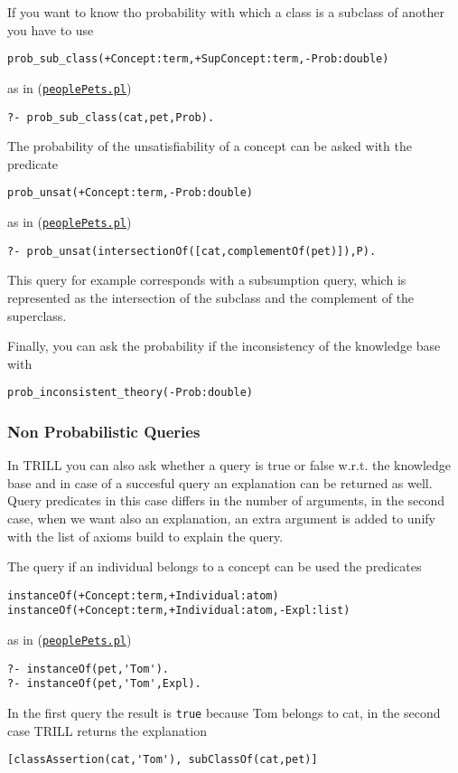 If you want to know tho probability with which a class is a subclass of another you have to use
\begin{verbatim}
prob_sub_class(+Concept:term,+SupConcept:term,-Prob:double)
\end{verbatim}
as in (\href{http://trill.lamping.unife.it/example/trill/peoplePets.pl}{\texttt{peoplePets.pl}})
\begin{verbatim}
?- prob_sub_class(cat,pet,Prob).
\end{verbatim}

The probability of the unsatisfiability of a concept can be asked with the predicate
\begin{verbatim}
prob_unsat(+Concept:term,-Prob:double)
\end{verbatim}
as in (\href{http://trill.lamping.unife.it/example/trill/peoplePets.pl}{\texttt{peoplePets.pl}})
\begin{verbatim}
?- prob_unsat(intersectionOf([cat,complementOf(pet)]),P).
\end{verbatim}
This query for example corresponds with a subsumption query, which is represented as the intersection of the subclass and the complement of the superclass.

Finally, you can ask the probability if the inconsistency of the knowledge base with
\begin{verbatim}
prob_inconsistent_theory(-Prob:double)
\end{verbatim}

\subsubsection{Non Probabilistic Queries}
In TRILL you can also ask whether a query is true or false w.r.t. the knowledge base and in case of a succesful query an explanation can be returned as well. 
Query predicates in this case differs in the number of arguments, in the second case, when we want also an explanation, an extra argument is added to unify with the list of axioms
build to explain the query.

The query if an individual belongs to a concept can be used the predicates
\begin{verbatim}
instanceOf(+Concept:term,+Individual:atom)
instanceOf(+Concept:term,+Individual:atom,-Expl:list)
\end{verbatim}
as in (\href{http://trill.lamping.unife.it/example/trill/peoplePets.pl}{\texttt{peoplePets.pl}})
\begin{verbatim}
?- instanceOf(pet,'Tom').
?- instanceOf(pet,'Tom',Expl).
\end{verbatim}
In the first query the result is \verb|true| because Tom belongs to cat, in the second case TRILL returns the explanation 
\begin{verbatim}
[classAssertion(cat,'Tom'), subClassOf(cat,pet)]
\end{verbatim}


